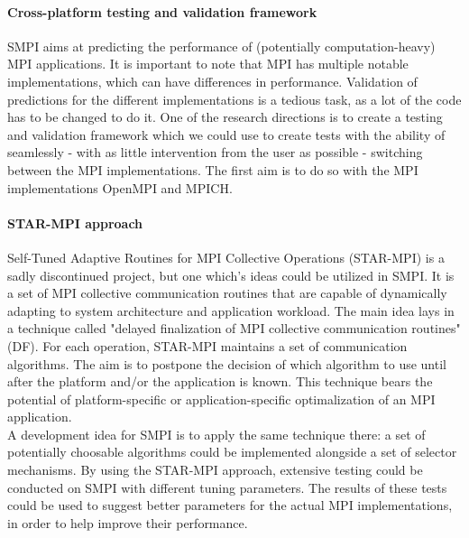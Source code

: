 \documentclass[a4paper]{article}
\begin{document}

\clearpage
\setcounter{page}{1}
\paragraph{Cross-platform testing and validation framework}
SMPI aims at predicting the performance of (potentially
computation-heavy) MPI applications. It is important to note that MPI
has multiple notable implementations, which can have differences in
performance. Validation of predictions for the different
implementations is a tedious task, as a lot of the code has to be
changed to do it. One of the research directions is to create a
testing and validation framework which we could use to create tests
with the ability of seamlessly - with as little intervention from the
user as possible - switching between the MPI implementations. The
first aim is to do so with the MPI implementations OpenMPI and MPICH.
\paragraph{STAR-MPI approach}
Self-Tuned Adaptive Routines for MPI Collective Operations (STAR-MPI)
is a sadly discontinued project, but one which's ideas could be
utilized in SMPI. It is a set of MPI collective communication routines
that are capable of dynamically adapting to system architecture and
application workload. The main idea lays in a technique called "delayed
finalization of MPI collective communication routines" (DF). For each
operation, STAR-MPI maintains a set of communication algorithms. The
aim is to postpone the decision of which algorithm to use until after
the platform and/or the application is known. This technique bears
the potential of platform-specific or application-specific
optimalization of an MPI application.\\
A development idea for SMPI is to apply the same technique there: a
set of potentially choosable algorithms could be implemented alongside
a set of selector mechanisms. By using the STAR-MPI approach,
extensive testing could be conducted on SMPI with different tuning
parameters. The results of these tests could be used to suggest
better parameters for the actual MPI implementations, in order to help
improve their performance.
\end{document}
